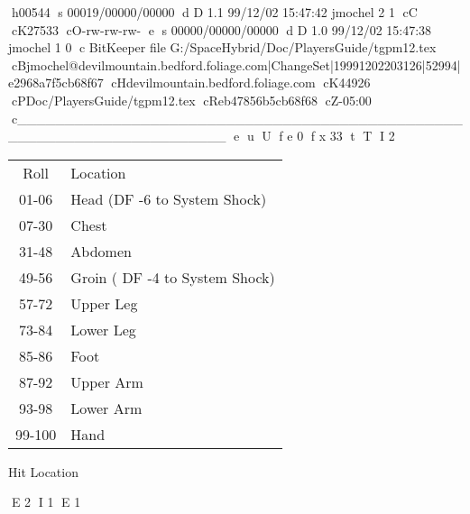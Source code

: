 h00544
s 00019/00000/00000
d D 1.1 99/12/02 15:47:42 jmochel 2 1
cC
cK27533
cO-rw-rw-rw-
e
s 00000/00000/00000
d D 1.0 99/12/02 15:47:38 jmochel 1 0
c BitKeeper file G:/SpaceHybrid/Doc/PlayersGuide/tgpm12.tex
cBjmochel@devilmountain.bedford.foliage.com|ChangeSet|19991202203126|52994|e2968a7f5cb68f67
cHdevilmountain.bedford.foliage.com
cK44926
cPDoc/PlayersGuide/tgpm12.tex
cReb47856b5cb68f68
cZ-05:00
c______________________________________________________________________
e
u
U
f e 0
f x 33
t
T
I 2

\begin{SHTable}
	\begin{tabular}{cl}
	Roll			  &  Location \\
	01-06		   &  Head (DF -6 to System Shock) \\
	07-30		   &  Chest \\
	31-48		   &  Abdomen \\
	49-56		   &  Groin ( DF -4 to System Shock) \\
	57-72		   &  Upper Leg \\
	73-84 			&  Lower Leg \\
	85-86		  		  &  Foot \\
	87-92		   &  Upper Arm \\
	93-98		   &  Lower Arm \\
	99-100			&  Hand \\	 
    \end{tabular}
    \caption{Hit Location}
\end{SHTable}


E 2
I 1
E 1
